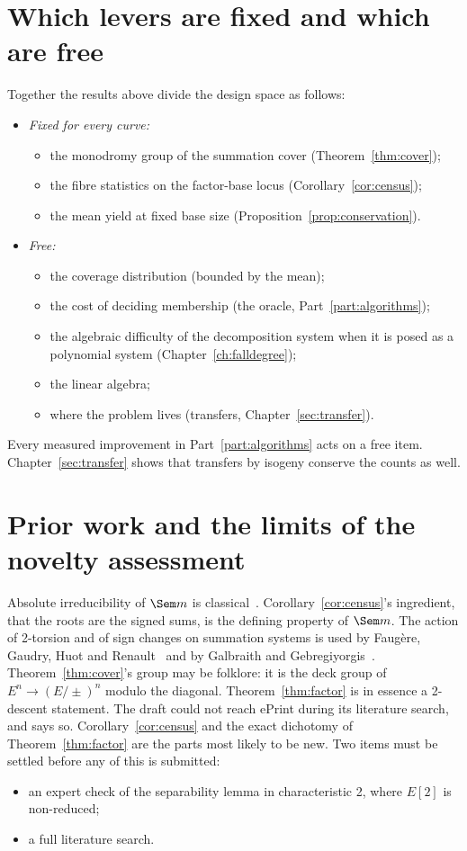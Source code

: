 \section{Which levers are fixed and which are free}\label{sec:levers}

Together the results above divide the design space as follows:
\begin{itemize}
\item \emph{Fixed for every curve:}
  \begin{itemize}
  \item the monodromy group of the summation cover (Theorem~\ref{thm:cover});
  \item the fibre statistics on the factor-base locus
    (Corollary~\ref{cor:census});
  \item the mean yield at fixed base size (Proposition~\ref{prop:conservation}).
  \end{itemize}
\item \emph{Free:}
  \begin{itemize}
  \item the coverage distribution (bounded by the mean);
  \item the cost of deciding membership (the oracle, Part~\ref{part:algorithms});
  \item the algebraic difficulty of the decomposition system when it is
    posed as a polynomial system (Chapter~\ref{ch:falldegree});
  \item the linear algebra;
  \item where the problem lives (transfers, Chapter~\ref{sec:transfer}).
  \end{itemize}
\end{itemize}
Every measured improvement in Part~\ref{part:algorithms} acts on a free
item. Chapter~\ref{sec:transfer} shows that transfers by isogeny conserve
the counts as well.

\section{Prior work and the limits of the novelty assessment}\label{sec:cover-prior}

Absolute irreducibility of $\Sem m$ is classical~\cite{semaev2004,gaudry2009}.
Corollary~\ref{cor:census}'s ingredient, that the roots are the signed sums,
is the defining property of $\Sem m$. The action of 2-torsion and of sign
changes on summation systems is used by Faugère, Gaudry, Huot and
Renault~\cite{fghr2014} and by Galbraith and
Gebregiyorgis~\cite{galbraith2014}. Theorem~\ref{thm:cover}'s group may be
folklore: it is the deck group of $E^n\to(E/\pm)^n$ modulo the diagonal.
Theorem~\ref{thm:factor} is in essence a 2-descent statement. The draft
could not reach ePrint during its literature search, and says so.
Corollary~\ref{cor:census} and the exact dichotomy of
Theorem~\ref{thm:factor} are the parts most likely to be new. Two items
must be settled before any of this is submitted:
\begin{itemize}
\item an expert check of the separability lemma in characteristic 2,
  where $E[2]$ is non-reduced;
\item a full literature search.
\end{itemize}
